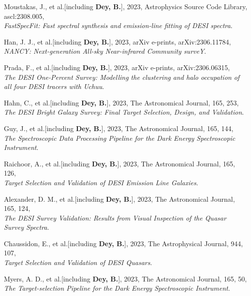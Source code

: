\item Moustakas, J., et al.[including \textbf{Dey, B.}], 2023, Astrophysics Source Code Library, ascl:2308.005, \\ \textit{FastSpecFit: Fast spectral synthesis and emission-line fitting of DESI spectra}. 
 

\item Han, J. J., et al.[including \textbf{Dey, B.}], 2023, arXiv e-prints, arXiv:2306.11784, \\ \textit{NANCY: Next-generation All-sky Near-infrared Community surveY}. 
 

\item Prada, F., et al.[including \textbf{Dey, B.}], 2023, arXiv e-prints, arXiv:2306.06315, \\ \textit{The DESI One-Percent Survey: Modelling the clustering and halo occupation of all four DESI tracers with Uchuu}. 
 

\item Hahn, C., et al.[including \textbf{Dey, B.}], 2023, The Astronomical Journal, 165, 253, \\ \textit{The DESI Bright Galaxy Survey: Final Target Selection, Design, and Validation}. 
 


 

\item Guy, J., et al.[including \textbf{Dey, B.}], 2023, The Astronomical Journal, 165, 144, \\ \textit{The Spectroscopic Data Processing Pipeline for the Dark Energy Spectroscopic Instrument}. 
 

\item Raichoor, A., et al.[including \textbf{Dey, B.}], 2023, The Astronomical Journal, 165, 126, \\ \textit{Target Selection and Validation of DESI Emission Line Galaxies}. 
 

\item Alexander, D. M., et al.[including \textbf{Dey, B.}], 2023, The Astronomical Journal, 165, 124, \\ \textit{The DESI Survey Validation: Results from Visual Inspection of the Quasar Survey Spectra}. 
 

\item Chaussidon, E., et al.[including \textbf{Dey, B.}], 2023, The Astrophysical Journal, 944, 107, \\ \textit{Target Selection and Validation of DESI Quasars}. 
 

\item Myers, A. D., et al.[including \textbf{Dey, B.}], 2023, The Astronomical Journal, 165, 50, \\ \textit{The Target-selection Pipeline for the Dark Energy Spectroscopic Instrument}. 
 


